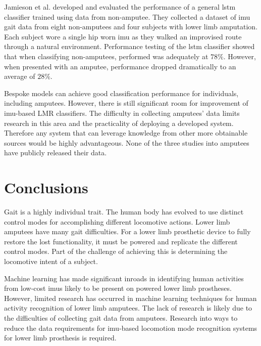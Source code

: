 Jamieson et al. developed and evaluated the performance of a general \acrshort{lstm} classifier trained using data from non-amputee. They collected a dataset of \acrshort{imu} gait data from eight non-amputees and four subjects with lower limb amputation. Each subject wore a single hip worn \acrshort{imu} as they walked an improvised route through a natural environment. Performance testing of the \acrshort{lstm} classifier showed that when classifying non-amputees, performed was adequately at $78\%$. However, when presented with an amputee, performance dropped dramatically to an average of $28\%$.\cite{Jamieson2021}

Bespoke models can achieve good classification performance for individuals, including amputees. However, there is still significant room for improvement of \acrshort{imu}-based LMR classifiers. The difficulty in collecting amputees' data limits research in this area and the practicality of deploying a developed system. Therefore any system that can leverage knowledge from other more obtainable sources would be highly advantageous. None of the three studies into amputees have publicly released their data.


\section{Conclusions}
\label{sec:background-conclusion}
Gait is a highly individual trait. The human body has evolved to use distinct control modes for accomplishing different locomotive actions. Lower limb amputees have many gait difficulties. For a lower limb prosthetic device to fully restore the lost functionality, it must be powered and replicate the different control modes. Part of the challenge of achieving this is determining the locomotive intent of a subject.

Machine learning has made significant inroads in identifying human activities from low-cost \acrshort{imu}s likely to be present on powered lower limb prostheses. However, limited research has occurred in machine learning techniques for human activity recognition of lower limb amputees. The lack of research is likely due to the difficulties of collecting gait data from amputees. Research into ways to reduce the data requirements for \acrshort{imu}-based locomotion mode recognition systems for lower limb prosthesis is required.
